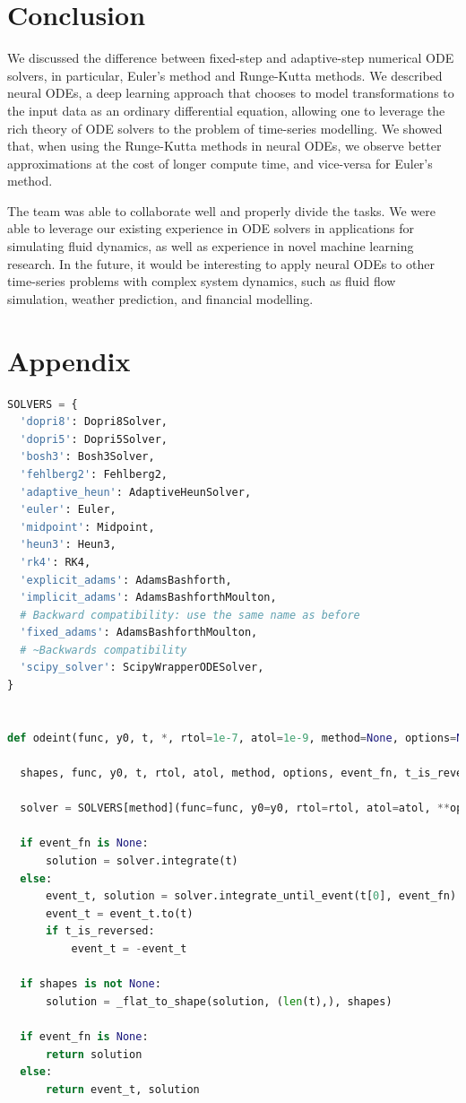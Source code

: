 \documentclass[11pt]{article}
\begin{document}
\section{Conclusion}

We discussed the difference between fixed-step and adaptive-step numerical ODE solvers, in particular, Euler's method and Runge-Kutta methods. We described neural ODEs, a deep learning approach that chooses to model transformations to the input data as an ordinary differential equation, allowing one to leverage the rich theory of ODE solvers to the problem of time-series modelling. We showed that, when using the Runge-Kutta methods in neural ODEs, we observe better approximations at the cost of longer compute time, and vice-versa for Euler's method.

The team was able to collaborate well and properly divide the tasks. We were able to leverage our existing experience in ODE solvers in applications for simulating fluid dynamics, as well as experience in novel machine learning research. In the future, it would be interesting to apply neural ODEs to other time-series problems with complex system dynamics, such as fluid flow simulation, weather prediction, and financial modelling.

\section{Appendix}
\begin{lstlisting}[language=Python,caption=Code for the ODE solver.]
SOLVERS = {
  'dopri8': Dopri8Solver,
  'dopri5': Dopri5Solver,
  'bosh3': Bosh3Solver,
  'fehlberg2': Fehlberg2,
  'adaptive_heun': AdaptiveHeunSolver,
  'euler': Euler,
  'midpoint': Midpoint,
  'heun3': Heun3,
  'rk4': RK4,
  'explicit_adams': AdamsBashforth,
  'implicit_adams': AdamsBashforthMoulton,
  # Backward compatibility: use the same name as before
  'fixed_adams': AdamsBashforthMoulton,
  # ~Backwards compatibility
  'scipy_solver': ScipyWrapperODESolver,
}


def odeint(func, y0, t, *, rtol=1e-7, atol=1e-9, method=None, options=None, event_fn=None):

  shapes, func, y0, t, rtol, atol, method, options, event_fn, t_is_reversed = _check_inputs(func, y0, t, rtol, atol, method, options, event_fn, SOLVERS)

  solver = SOLVERS[method](func=func, y0=y0, rtol=rtol, atol=atol, **options)

  if event_fn is None:
      solution = solver.integrate(t)
  else:
      event_t, solution = solver.integrate_until_event(t[0], event_fn)
      event_t = event_t.to(t)
      if t_is_reversed:
          event_t = -event_t

  if shapes is not None:
      solution = _flat_to_shape(solution, (len(t),), shapes)

  if event_fn is None:
      return solution
  else:
      return event_t, solution
\end{lstlisting}
\end{document}
